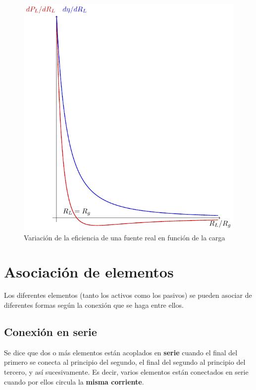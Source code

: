   \begin{figure}
    \centering
    \includegraphics[height=0.3\textheight]{../figs/FuenteReal_DifPotencia.pdf}
    \caption{Variación de la eficiencia de una fuente real en función
      de la carga}
    \label{fig:dif-eficiencia-fuente-tension}
  \end{figure}
	
  \section{Asociación de elementos}
	
  Los diferentes elementos (tanto los activos como los pasivos) se
  pueden asociar de diferentes formas según la conexión que se haga
  entre ellos.
	
	\subsection{Conexión en serie}
	Se dice que dos o más elementos están acoplados en
        \textbf{serie} cuando el final del primero se conecta al
        principio del segundo, el final del segundo al principio del
        tercero, y así sucesivamente. Es decir, varios elementos están
        conectados en serie cuando por ellos circula la \textbf{misma
          corriente}.
	
